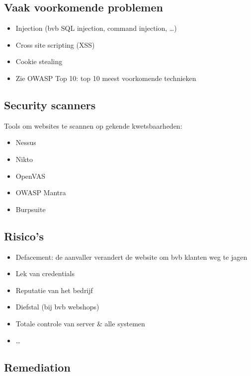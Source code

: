 \documentclass{article}
\begin{document}
\subsection{Vaak voorkomende problemen}

\begin{itemize}
    \item Injection (bvb SQL injection, command injection, \dots)
    \item Cross site scripting (XSS)
    \item Cookie stealing
    \item Zie OWASP Top 10: top 10 meest voorkomende technieken
\end{itemize}

\subsection{Security scanners}

Tools om websites te scannen op gekende kwetsbaarheden:

\begin{itemize}
    \item Nessus
    \item Nikto
    \item OpenVAS
    \item OWASP Mantra
    \item Burpsuite
\end{itemize}

\subsection{Risico's}

\begin{itemize}
    \item Defacement: de aanvaller verandert de website om bvb klanten weg te jagen
    \item Lek van credentials
    \item Reputatie van het bedrijf
    \item Diefstal (bij bvb webshops)
    \item Totale controle van server \& alle systemen
    \item \dots
\end{itemize}

\subsection{Remediation}
\end{document}
